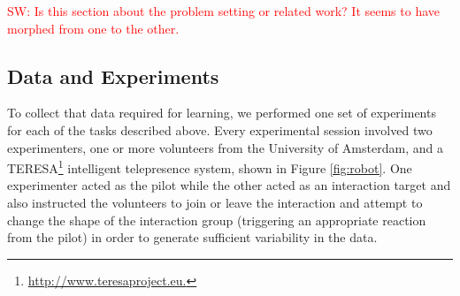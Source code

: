 \documentclass[letterpaper, 10 pt, conference]{ieeeconf}
\newcommand{\sw}[1]{\textcolor{red}{SW: #1}}
\begin{document}

\sw{Is this section about the problem setting or related work?  It seems to have morphed from one to the other.}



\subsection{Data and Experiments \label{subsec:data_exp}} 

To collect that data required for learning, we performed one set of experiments for each of the tasks described above. Every experimental session involved two experimenters, one or more volunteers from the University of Amsterdam, and a TERESA\footnote{\url{http://www.teresaproject.eu.}} intelligent telepresence system, shown in Figure \ref{fig:robot}.  One experimenter acted as the pilot while the other acted as an interaction target and also instructed the volunteers to join or leave the interaction and attempt to change the shape of the interaction group (triggering an appropriate reaction from the pilot) in order to generate sufficient variability in the data.  
\end{document}
